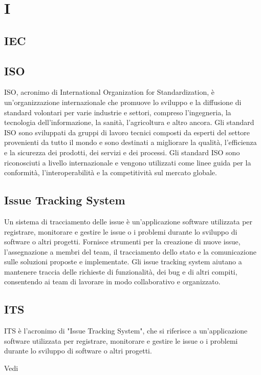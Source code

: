 \section{I}

\vspace{2em}
\subsection*{IEC}

\vspace{2em}
\subsection*{ISO}
ISO, acronimo di International Organization for Standardization, è un'organizzazione internazionale che promuove lo sviluppo e la diffusione di standard volontari per varie industrie e settori, compreso l'ingegneria, la tecnologia dell'informazione, la sanità, l'agricoltura e altro ancora. Gli standard ISO sono sviluppati da gruppi di lavoro tecnici composti da esperti del settore provenienti da tutto il mondo e sono destinati a migliorare la qualità, l'efficienza e la sicurezza dei prodotti, dei servizi e dei processi. Gli standard ISO sono riconosciuti a livello internazionale e vengono utilizzati come linee guida per la conformità, l'interoperabilità e la competitività sul mercato globale.

\vspace{2em}
\subsection*{Issue Tracking System}
Un sistema di tracciamento delle issue è un'applicazione software utilizzata per registrare, monitorare e gestire le issue o i problemi durante lo sviluppo di software o altri progetti. Fornisce strumenti per la creazione di nuove issue, l'assegnazione a membri del team, il tracciamento dello stato e la comunicazione sulle soluzioni proposte e implementate. Gli issue tracking system aiutano a mantenere traccia delle richieste di funzionalità, dei bug e di altri compiti, consentendo ai team di lavorare in modo collaborativo e organizzato.

\vspace{2em}
\subsection*{ITS}
ITS è l'acronimo di "Issue Tracking System", che si riferisce a un'applicazione software utilizzata per registrare, monitorare e gestire le issue o i problemi durante lo sviluppo di software o altri progetti.

\par Vedi 
